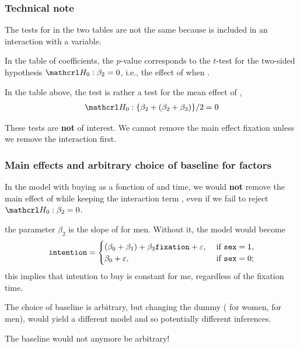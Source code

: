 \documentclass{beamer}
\begin{document}
 \begin{frame}
\frametitle{Technical note}
\bi
\item The tests for  in the two tables are not the same because  is included in an interaction with a  variable. 
\item In the table of coefficients, the $p$-value corresponds to the $t$-test for the two-sided hypothesis $\Hy_0:\beta_2=0$, i.e., the effect of  when . 
\item In the table above, the test is rather a test for the mean effect of ,
\begin{align*}
\Hy_0: \{\beta_2+(\beta_2+\beta_3)\}/2=0
\end{align*}
\item These tests are \textbf{not} of interest. We cannot remove the main effect fixation unless we remove the interaction first. 
\ei
\end{frame}
\begin{frame}
  \frametitle{Main effects and arbitrary choice of baseline for factors}
  \bi \item In the model with buying  as a fonction of  and  time, we would \textbf{not} remove the main effect of  while keeping the interaction term , even if we fail to reject $\Hy_0:\beta_2=0$.
  \item the parameter $\beta_2$ is the slope of  for men. Without it, the model would become
\begin{align*}
\texttt{intention} = 
\begin{cases}
(\beta_0 + \beta_1) + \beta_3\texttt{fixation} + \varepsilon, & \text{ if } \texttt{sex}=1,\\
  \beta_0 + \varepsilon, & \text{ if } \texttt{sex}=0;                 
\end{cases}
\end{align*}  
this implies that intention to buy is constant for me, regardless of the fixation time.
\item The choice of baseline is arbitrary, but changing the dummy  ( for women,  for men), would yield a different model and so potentially different inferences.
\item The baseline would not anymore be arbitrary!
\ei
 \end{frame}
 
\end{document}
